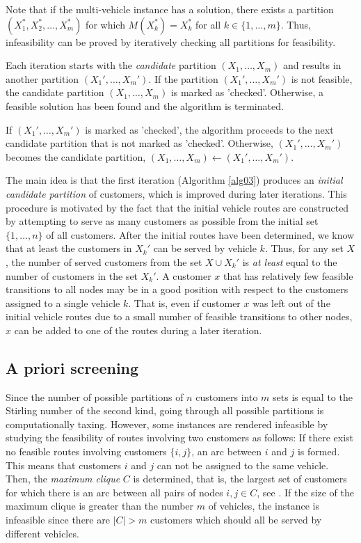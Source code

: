 \documentclass[dissertation,draft*]{aaltoseries}
\begin{document}
Note that if the multi-vehicle instance has a solution,
there exists a partition $(X_1^*, X_2^*, \ldots, X_m^*)$ for which $M(X_k^*)=X_k^*$ for all $k \in \{1,\ldots,m\}$. 
Thus, infeasibility can be proved by iteratively checking all partitions for feasibility.

Each iteration starts with the \emph{candidate} partition $(X_1,\ldots,X_m)$ and 
results in another partition $(X_1',\ldots,X_m')$. If the partition $(X_1',\ldots,X_m')$ is not feasible,
the candidate partition $(X_1,\ldots,X_m)$ is marked as 'checked'. Otherwise, a feasible solution 
has been found and the algorithm is terminated.

If $(X_1',\ldots,X_m')$ is marked as 'checked', the algorithm proceeds to the next candidate partition that is
not marked as 'checked'.
Otherwise, $(X_1',\ldots,X_m')$ becomes the
candidate partition, $(X_1,\ldots,X_m) \leftarrow (X_1',\ldots,X_m')$. 

The main idea is that the first iteration (Algorithm \ref{alg03}) produces an \emph{initial candidate partition} of customers, 
which is improved during later iterations. This procedure is motivated by the fact that the initial vehicle routes are
constructed by attempting to serve as many customers as possible from the initial set 
$\{1,\ldots,n\}$ of all customers. After the initial routes have been determined, 
we know that at least the 
customers in $X_k'$ can be served by vehicle $k$. Thus, for any set $X$, the number of 
served customers from the set $X \cup X_k'$ is \emph{at least} equal to the number of customers
in the set $X_k'$. A customer $x$ that has relatively few feasible transitions to all nodes may 
be in a good position with respect to the customers assigned to a
single vehicle $k$. That is, even if customer $x$ was left out of the initial 
vehicle routes due to a small number of feasible transitions to other nodes,
$x$ can be added to one of the routes during a later iteration. 


\subsection{A priori screening}
\label{earlydetection}
Since the  
number of possible partitions of $n$ customers into $m$ sets is equal to the Stirling number of the second kind,
going through all possible partitions is computationally taxing.
However, some instances 
are rendered infeasible by studying the feasibility of routes involving two customers as follows: 
If there exist no feasible
routes involving customers $\{i,j\}$, an arc between $i$ and $j$ is formed. This means that 
customers $i$ and $j$ can not be assigned to the same vehicle. Then, the \emph{maximum clique} $C$
is determined, that is, the largest set of customers for which there is
an arc between all pairs of nodes $i,j \in C$, see \citep{wood1997}. If the size of the maximum clique
is greater than the number $m$ of vehicles, the instance is infeasible since there are $|C| > m$ customers
which should all be served by different vehicles. 
\end{document}
